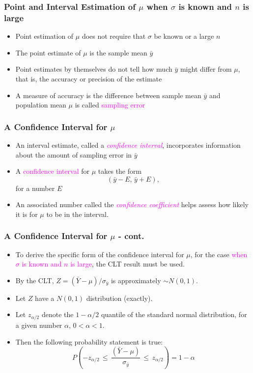 \documentclass[xcolor=dvipsnames,12pt]{beamer}
\begin{document}
\begin{frame}
\frametitle{Point and Interval Estimation of
{\boldmath$\mu$} when {\boldmath$\sigma$} is known
and {\boldmath$n$} is large}
\begin{itemize}
\item  Point estimation of $\mu$ does not require that
$\sigma$ be known or a large $n$
\item  The point estimate of $\mu$ is the sample mean $\bar{y}$
\item  Point estimates by themselves do not tell  how much 
$\bar{y}$ might differ from $\mu$, that is, the accuracy or
precision of the estimate 
\item A measure of accuracy is the difference between sample
mean $\bar{y}$ and population mean $\mu$ is called \textcolor{magenta}{sampling error}
\end{itemize}
\end{frame}



\begin{frame}
\frametitle{A Confidence  Interval for {\boldmath$\mu$}}
\begin{itemize}
\item An interval estimate, called a   \textcolor{magenta}{\textit{confidence interval}}, incorporates information about the amount of sampling error in $\bar{y}$  
\item A \textcolor{magenta}{confidence interval} for $\mu$
takes the form 
$$(\bar{y} - E,\, \bar{y} + E),$$
for a number $E$
\item An associated number called the \textcolor{magenta}{\textit{confidence coefficient}}  helps 
assess how likely it is for $\mu$ to be in the interval.
\end{itemize}
\end{frame}


\begin{frame}
\frametitle{A Confidence  Interval for {\boldmath$\mu$} - cont.}
\begin{itemize}
\item To derive the specific form of the confidence
interval for $\mu$, for the case \textcolor{magenta}{when $\sigma$ is
known and  $n$ is large}, the CLT result must be used.
\item By the CLT, $Z = (\bar{Y} - \mu)/\sigma_{\bar{y}}$ is
approximately $ \sim N(0, 1)$.
\item Let  $Z$ have a  $ N(0, 1)$  distribution (exactly).
\item Let $z_{\alpha/2}$ denote the 
$1 - \alpha/2$ quantile of the standard normal distribution, for
a given number $\alpha$, $0 < \alpha < 1$. 
\item  Then the following probability statement is true:
$$P\left (-z_{\alpha/2}\, \leq\, \frac{(\bar{Y} - \mu)}{
          \sigma_{\bar{y}}}\, \leq\, z_{\alpha/2}\right ) = 1 - \alpha$$ 
\end{itemize}
\end{frame}          
      
\end{document}
